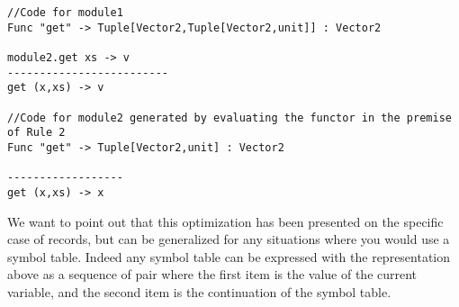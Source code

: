 \begin{lstlisting}
//Code for module1
Func "get" -> Tuple[Vector2,Tuple[Vector2,unit]] : Vector2

module2.get xs -> v
-------------------------
get (x,xs) -> v

//Code for module2 generated by evaluating the functor in the premise of Rule 2
Func "get" -> Tuple[Vector2,unit] : Vector2

------------------
get (x,xs) -> x
\end{lstlisting}

We want to point out that this optimization has been presented on the specific case of records, but can be generalized for any situations where you would use a symbol table. Indeed any symbol table can be expressed with the representation above as a sequence of pair where the first item is the value of the current variable, and the second item is the continuation of the symbol table.
